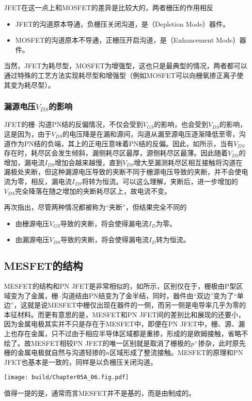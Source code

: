 JFET在这一点上和MOSFET的差异是比较大的，两者栅压的作用相反
\begin{itemize}
    \item JFET的沟道原本导通，负栅压关闭沟道，是（Depletion Mode）器件。
    \item MOSFET的沟道原本不导通，正栅压开启沟道，是（Enhancement Mode）器件。
\end{itemize}
当然，JFET为耗尽型，MOSFET为增强型，这也只是最典型的情况，两者都可以通过特殊的工艺方法实现耗尽型和增强型（例如MOSFET可以向栅氧掺正离子使其变为耗尽型）。

\subsubsection{漏源电压$V_{DS}$的影响}
JFET的栅--沟道PN结的反偏情况，不仅会受到$V_{GS}$的影响，也会受到$V_{DS}$的影响，这是因为，由于$V_{DS}$的电压降是在漏和源间，沟道从漏至源电压逐渐降低至零，沟道作为PN结的负端，其上的正电压意味着PN结的反偏。因此，如所示，当有$V_{DS}$存在时，耗尽区会发生倾斜，漏侧耗尽区最厚，源侧耗尽区最薄。因此随着$V_{DS}$的增加，漏电流$I_{DS}$增加会越来越慢，直到$V_{DS}$增大至漏测耗尽区相互接触将沟道在漏极处夹断，但这种漏源电压导致的夹断不同于栅源电压导致的夹断，并不会使电流为零，相反，漏电流$I_{DS}$将转为恒流。可以这么理解，夹断后，进一步增加的$V_{DS}$完全降落在随之增加的夹断耗尽区上，故电流不变。

再次指出，尽管两种情况都被称为“夹断”，但结果完全不同的
\begin{itemize}
    \item 由栅源电压$V_{GS}$导致的夹断，将会使得漏电流$I_D$为零。
    \item 由漏源电压$V_{DS}$导致的夹断，将会使得漏电流$I_D$转为恒流。
\end{itemize}

\subsection{MESFET的结构}
MESFET的结构和PN JFET是非常相似的，如所示，区别仅在于，栅极由P型区域变为了金属，栅--沟道结由PN结变为了金半结，同时，器件由“双边”变为了“单边”，这就是说MESFET中栅仅出现在器件的一侧，而另一侧是电导率几乎为零的本征材料。而更有意思的是，MESFET和PN JFET间的差别比和展现的还要小，因为金属电极其实并不只是存在于MESFET中，即便在PN JFET中，栅、源、漏上也存在金属，只不过由于相应半导体区域都是重掺，形成的是欧姆接触，省略不绘了。故MESFET相较PN JFET的唯一区别就是取消了栅极的$p^{+}$掺杂，此时原先栅的金属电极就自然与沟道轻掺的$n$区域形成了整流接触。MESFET的原理和PN JFET也基本是一致的，同样是以负栅压关闭沟道。
\begin{Figure}[MESFET的实际结构]
    \texttt{[image: build/Chapter05A\_06.fig.pdf]}
\end{Figure}

值得一提的是，通常而言MESFET并不是基的，而是由制成的。

